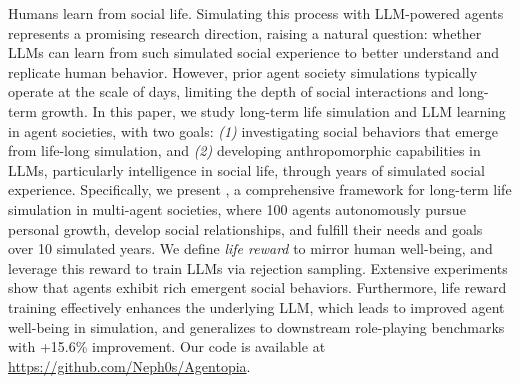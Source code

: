 Humans learn from social life.
Simulating this process with LLM-powered agents represents a promising research direction, raising a natural question: whether LLMs can learn from such simulated social experience to better understand and replicate human behavior.
However, prior agent society simulations typically operate at the scale of days, limiting the depth of social interactions and long-term growth.
In this paper, we study long-term life simulation and LLM learning in agent societies, with two goals:
\textit{(1)} investigating social behaviors that emerge from life-long simulation, and
\textit{(2)} developing anthropomorphic capabilities in LLMs, particularly intelligence in social life, through years of simulated social experience.
Specifically, we present \method, a comprehensive framework for long-term life simulation in multi-agent societies, where 100 agents autonomously pursue personal growth, develop social relationships, and fulfill their needs and goals over 10 simulated years.
We define \textit{life reward} to mirror human well-being, and leverage this reward to train LLMs via rejection sampling. 
Extensive experiments show that agents exhibit rich emergent social behaviors.
Furthermore, life reward training effectively enhances the underlying LLM,
which leads to improved agent well-being in simulation, 
and generalizes to downstream role-playing benchmarks with +15.6\% improvement.
Our code is available at \href{https://github.com/Neph0s/Agentopia}{https://github.com/Neph0s/Agentopia}.
